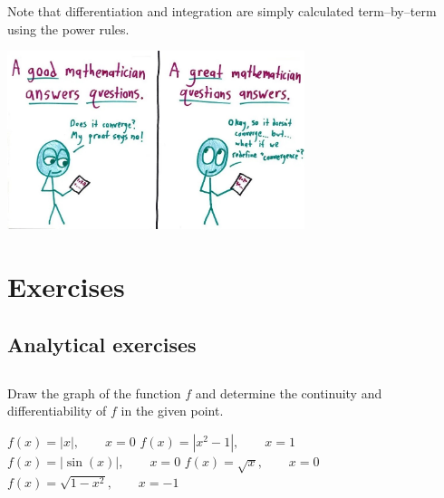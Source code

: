 Note that differentiation and integration are simply calculated term--by--term using the power rules.


	\begin{center}
			\includegraphics[width=0.65\textwidth]{GreatMath_3.jpg}
	\end{center}
 
\fi
\fi




\ifcourse
\newpage
\section{Exercises}

\subsection{Analytical exercises}

\renewcommand{\ExerciseListName}{Opgave}

\subsection*{}
\begin{Exercise} Draw the graph of the function $f$ and determine the continuity and differentiability of $f$ in the given point. 
	\begin{multicols}{2}
		\Question[difficulty = 1] $f(x)=|x|, \qquad x=0$
		\Question[difficulty = 1] $f(x)=|x^2-1|, \qquad x=1$
		\Question[difficulty = 1] $f(x)=|\sin (x)|, \qquad x=0$
		\Question[difficulty = 1] $f(x)=\sqrt{x}, \qquad x=0$
		\Question[difficulty = 1] $f(x)=\sqrt{1-x^2}, \qquad x=-1$
	    \EndCurrentQuestion
	\end{multicols}

\end{Exercise}

